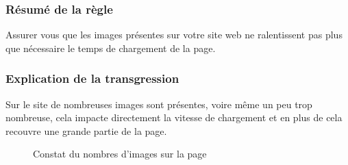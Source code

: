 \documentclass{article}[12pt]
\begin{document}
   \subsubsection*{Résumé de la règle}
   Assurer vous que les images présentes sur votre site web ne ralentissent pas plus que nécessaire le temps de chargement de la page.
   \subsubsection*{Explication de la transgression}
   Sur le site de nombreuses images sont présentes, voire même un peu trop nombreuse, cela impacte directement la vitesse de chargement et en plus de cela recouvre une grande partie de la page.
   \begin{figure}[H]
   	\centering
   	\caption{Constat du nombres d'images sur la page}
   \end{figure}
\end{document}
